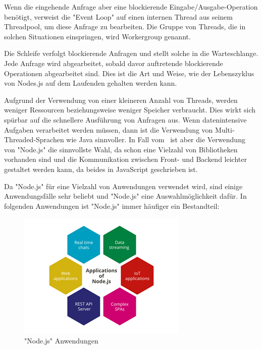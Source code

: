 Wenn die eingehende Anfrage aber eine blockierende Eingabe/Ausgabe-Operation benötigt, verweist die "Event Loop" auf einen internen Thread aus seinem Threadpool, um diese Anfrage zu bearbeiten. Die Gruppe von Threads, die in solchen Situationen einspringen, wird Workergroup genannt. \cite{NodeJsArch} \cite{NodeJsArch2}

Die Schleife verfolgt blockierende Anfragen und stellt solche in die Warteschlange. Jede Anfrage wird abgearbeitet, sobald davor auftretende blockierende Operationen abgearbeitet sind. Dies ist die Art und Weise, wie der Lebenszyklus von Nodes.js auf dem Laufenden gehalten werden kann. \cite{NodeJsArch} \cite{NodeJsArch2}

Aufgrund der Verwendung von einer kleineren Anzahl von Threads, werden weniger Ressourcen beziehungsweise weniger Speicher verbraucht. Dies wirkt sich spürbar auf die schnellere Ausführung von Anfragen aus. Wenn datenintensive Aufgaben verarbeitet werden müssen, dann ist die Verwendung von Multi-Threaded-Sprachen wie Java sinnvoller. In Fall vom \ZELIA\ ist aber die Verwendung von "Node.js" die sinnvollste Wahl, da schon eine Vielzahl von Bibliotheken vorhanden sind und die Kommunikation zwischen Front- und Backend leichter gestaltet werden kann, da beides in JavaScript geschrieben ist. \cite{Arocom} \cite{NodeJsArch2} \cite{NodeJsArch}


Da "Node.js" für eine Vielzahl von Anwendungen verwendet wird, sind einige Anwendungsfälle sehr beliebt und "Node.js" eine Auswahlmöglichkeit dafür. In folgenden Anwendungen ist "Node.js" immer häufiger ein Bestandteil:

\begin{figure}[H]
    \centering
    \includegraphics{media/NodeJs/NodeJsAnwendungen.png}
    \caption{"Node.js" Anwendungen \cite{AnwendungenFoto}}
\end{figure}

